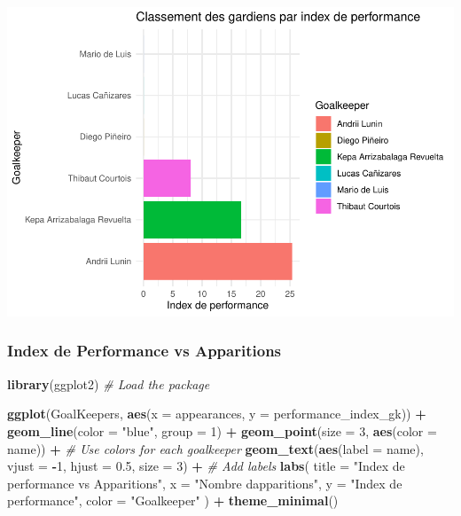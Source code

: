 \documentclass[
  6pt,
]{article}
\newenvironment{Shaded}{\begin{snugshade}}{\end{snugshade}}
\newcommand{\AttributeTok}[1]{\textcolor[rgb]{0.13,0.29,0.53}{#1}}
\newcommand{\CommentTok}[1]{\textcolor[rgb]{0.56,0.35,0.01}{\textit{#1}}}
\newcommand{\DecValTok}[1]{\textcolor[rgb]{0.00,0.00,0.81}{#1}}
\newcommand{\FloatTok}[1]{\textcolor[rgb]{0.00,0.00,0.81}{#1}}
\newcommand{\FunctionTok}[1]{\textcolor[rgb]{0.13,0.29,0.53}{\textbf{#1}}}
\newcommand{\NormalTok}[1]{#1}
\newcommand{\SpecialCharTok}[1]{\textcolor[rgb]{0.81,0.36,0.00}{\textbf{#1}}}
\newcommand{\StringTok}[1]{\textcolor[rgb]{0.31,0.60,0.02}{#1}}
\begin{document}
\includegraphics[width=0.8\linewidth]{Analyse_Impact_Performances_Joueurs_files/figure-latex/IndexPer - Gardiern-1}

\subsubsection{Index de Performance vs
Apparitions}\label{index-de-performance-vs-apparitions}

\begin{Shaded}
\begin{Highlighting}[]
\FunctionTok{library}\NormalTok{(ggplot2)             }\CommentTok{\# Load the package}

\FunctionTok{ggplot}\NormalTok{(GoalKeepers, }\FunctionTok{aes}\NormalTok{(}\AttributeTok{x =}\NormalTok{ appearances, }\AttributeTok{y =}\NormalTok{ performance\_index\_gk)) }\SpecialCharTok{+}
  \FunctionTok{geom\_line}\NormalTok{(}\AttributeTok{color =} \StringTok{"blue"}\NormalTok{, }\AttributeTok{group =} \DecValTok{1}\NormalTok{) }\SpecialCharTok{+}
  \FunctionTok{geom\_point}\NormalTok{(}\AttributeTok{size =} \DecValTok{3}\NormalTok{, }\FunctionTok{aes}\NormalTok{(}\AttributeTok{color =}\NormalTok{ name)) }\SpecialCharTok{+}  \CommentTok{\# Use colors for each goalkeeper}
  \FunctionTok{geom\_text}\NormalTok{(}\FunctionTok{aes}\NormalTok{(}\AttributeTok{label =}\NormalTok{ name), }\AttributeTok{vjust =} \SpecialCharTok{{-}}\DecValTok{1}\NormalTok{, }\AttributeTok{hjust =} \FloatTok{0.5}\NormalTok{, }\AttributeTok{size =} \DecValTok{3}\NormalTok{) }\SpecialCharTok{+}  \CommentTok{\# Add labels}
  \FunctionTok{labs}\NormalTok{(}
    \AttributeTok{title =} \StringTok{"Index de performance vs Apparitions"}\NormalTok{,}
    \AttributeTok{x =} \StringTok{"Nombre d\textquotesingle{}apparitions"}\NormalTok{,}
    \AttributeTok{y =} \StringTok{"Index de performance"}\NormalTok{,}
    \AttributeTok{color =} \StringTok{"Goalkeeper"}
\NormalTok{  ) }\SpecialCharTok{+}
  \FunctionTok{theme\_minimal}\NormalTok{()}
\end{Highlighting}
\end{Shaded}
\end{document}
